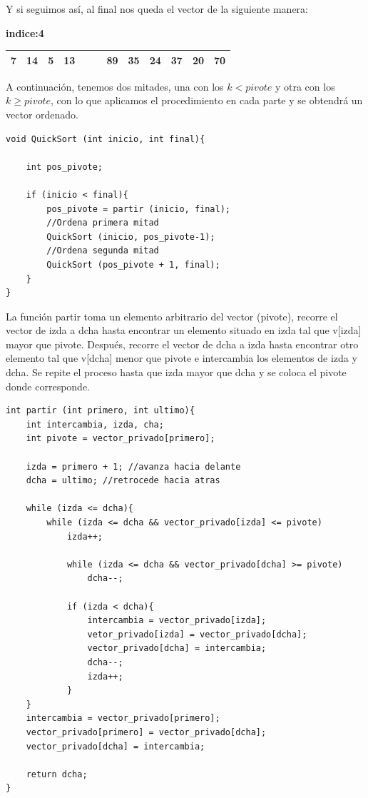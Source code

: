 \documentclass[10pt,a4paper,spanish]{report}
\theoremstyle{definition}
\theoremstyle{remark}
\begin{document}
Y si seguimos así, al final nos queda el vector de la siguiente manera:

\textbf{indice:4}
\begin{center}
\begin{tabular}{|c|c|c|c|c|c|c|c|c|c|c|}
\hline
7 & 14 & 5 & 13 & \cellcolor{blue} \textcolor{white}{15} & \cellcolor{red}89 & \cellcolor{red} 35 & \cellcolor{red}24 & \cellcolor{red}37 & \cellcolor{red}20 & \cellcolor{red}70 \\
\hline  
\end{tabular}
\end{center}
A continuación, tenemos dos mitades, una con los $k < pivote$ y otra con los $k\ge pivote$, con lo que aplicamos el procedimiento en cada parte y se obtendrá un vector ordenado.

\begin{verbatim}
void QuickSort (int inicio, int final){

    int pos_pivote;

    if (inicio < final){
        pos_pivote = partir (inicio, final);
        //Ordena primera mitad
        QuickSort (inicio, pos_pivote-1);
        //Ordena segunda mitad
        QuickSort (pos_pivote + 1, final);
    }
}
\end{verbatim}


La función partir toma un elemento arbitrario del vector (pivote), recorre el vector de izda a dcha hasta encontrar un elemento situado en izda tal que v[izda] mayor que pivote. Después, recorre el vector de dcha a izda hasta encontrar otro elemento tal que v[dcha] menor que pivote e intercambia los elementos de izda y dcha. Se repite el proceso hasta que izda mayor que dcha y se coloca el pivote donde corresponde.

\begin{verbatim}
int partir (int primero, int ultimo){
    int intercambia, izda, cha;
    int pivote = vector_privado[primero];

    izda = primero + 1; //avanza hacia delante
    dcha = ultimo; //retrocede hacia atras

    while (izda <= dcha){
        while (izda <= dcha && vector_privado[izda] <= pivote)
            izda++;

            while (izda <= dcha && vector_privado[dcha] >= pivote)
                dcha--;

            if (izda < dcha){
                intercambia = vector_privado[izda];
                vetor_privado[izda] = vector_privado[dcha];
                vector_privado[dcha] = intercambia;
                dcha--;
                izda++;
            }
    }
    intercambia = vector_privado[primero];
    vector_privado[primero] = vector_privado[dcha];
    vector_privado[dcha] = intercambia;

    return dcha;
}
\end{verbatim}
\end{document}
